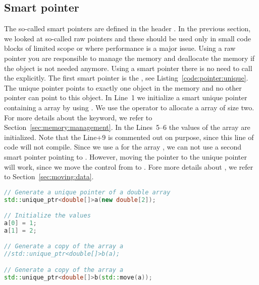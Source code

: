 \subsection{Smart pointer}
\label{cpp:smart:pointer}
The so-called smart pointers are defined in the header . In the previous section, we looked at so-called raw pointers and these should be used only in small code blocks of limited scope or where performance is a major issue. Using a raw pointer you are responsible to manage the memory and deallocate the memory if the object is not needed anymore. Using a smart pointer there is no need to call the  explicitly. The first smart pointer is the , see Listing~\ref{code:pointer:unique}. The unique pointer points to exactly one object in the memory and no other pointer can point to this object. In Line~1 we initialize a smart unique pointer containing a array  by using . We use the  operator to allocate a array of size two. For more details about the  keyword, we refer to Section~\ref{sec:memory:management}. In the Lines~5--6 the values of the array are initialized. Note that the Line+9 is commented out on purpose, since this line of code will not compile. Since we use a  for the array , we can not use a second smart pointer  pointing to . However, moving the pointer  to the unique pointer  will work, since we move the control from  to . Fore more details about , we refer to Section~\ref{sec:moving:data}.\\

\begin{lstlisting}[language=c++,caption={Using the smart unique pointer.
\label{code:pointer:unique}},float,floatplacement=tb]
// Generate a unique pointer of a double array
std::unique_ptr<double[]>a(new double[2]);

// Initialize the values
a[0] = 1;
a[1] = 2;

// Generate a copy of the array a
//std::unique_ptr<double[]>b(a);

// Generate a copy of the array a
std::unique_ptr<double[]>b(std::move(a));
\end{lstlisting}


